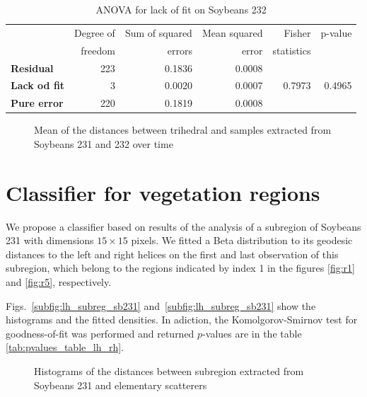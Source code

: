 \documentclass[12pt]{article}
\begin{document}
\begin{table}[hbt]
  \centering
  \caption{ANOVA for lack of fit on Soybeans 232}
  \label{tab:anova_sb232}
  \begin{tabular}{lrrrrr}
    \toprule
    & Degree of & Sum of squared & Mean squared & Fisher & p-value\\
    & freedom & errors & error & statistics &\\
    \cmidrule(lr){2-6}
    \textbf{Residual} & 223 & 0.1836 & 0.0008 & &\\
    \textbf{Lack od fit} & 3 & 0.0020 & 0.0007 & 0.7973 & 0.4965\\
    \textbf{Pure error} & 220 & 0.1819 & 0.0008 & &\\
    \bottomrule
  \end{tabular}
\end{table}

\begin{figure}[hbt]
  \caption{Mean of the distances between trihedral and samples extracted from Soybeans 231 and 232 over time}
  \label{fig:tri_mean_sb_231_232}
\end{figure}

\section{Classifier for vegetation regions}

We propose a classifier based on results of the analysis of a subregion of Soybeans 231 with dimensions $15\times 15$ pixels. 
We fitted a Beta distribution to its geodesic distances to the left and right helices on the first and last observation of this subregion, which belong to the regions indicated by index 1 in the figures \ref{fig:r1} and \ref{fig:r5}, respectively. 

Figs.~\ref{subfig:lh_subreg_sb231} and~\ref{subfig:lh_subreg_sb231} show the histograms and the fitted densities. 
In adiction, the Komolgorov-Smirnov test for goodness-of-fit was performed and returned $p$-values are in the table \ref{tab:pvalues_table_lh_rh}.

\begin{figure}[hbt]
  \caption{Histograms of the distances between subregion extracted from Soybeans 231 and elementary scatterers}
  \label{fig:hist_lh_rh}
\end{figure}
\end{document}
